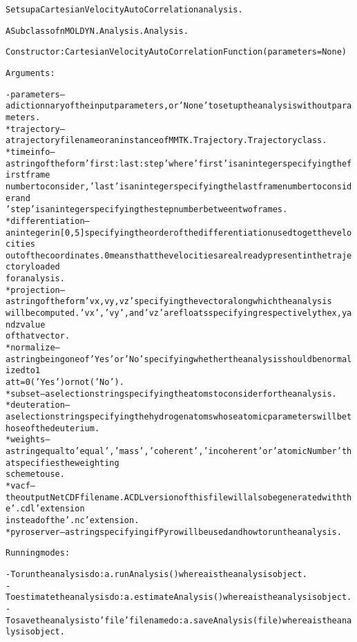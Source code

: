 \begin{alltt}
Sets up a Cartesian Velocity AutoCorrelation analysis.

A Subclass of nMOLDYN.Analysis.Analysis. 

Constructor: CartesianVelocityAutoCorrelationFunction({\textbar}parameters{\textbar} = None)

Arguments:

    - {\textbar}parameters{\textbar} -- a dictionnary of the input parameters, or 'None' to set up the analysis without parameters.
        * trajectory      -- a trajectory file name or an instance of MMTK.Trajectory.Trajectory class.
        * timeinfo        -- a string of the form 'first:last:step' where 'first' is an integer specifying the first frame 
                             number to consider, 'last' is an integer specifying the last frame number to consider and 
                             'step' is an integer specifying the step number between two frames.
        * differentiation -- an integer in [0,5] specifying the order of the differentiation used to get the velocities
                             out of the coordinates. 0 means that the velocities are already present in the trajectory loaded
                             for analysis.
        * projection      -- a string of the form 'vx,vy,vz' specifying the vector along which the analysis
                             will be computed. 'vx', 'vy', and 'vz' are floats specifying respectively the x, y and z value 
                             of that vector.
        * normalize       -- a string being one of 'Yes' or 'No' specifying whether the analysis should be normalized to 1
                             at t = 0 ('Yes') or not ('No').
        * subset          -- a selection string specifying the atoms to consider for the analysis.
        * deuteration     -- a selection string specifying the hydrogen atoms whose atomic parameters will be those of the deuterium.
        * weights         -- a string equal to 'equal', 'mass', 'coherent' , 'incoherent' or 'atomicNumber' that specifies the weighting
                             scheme to use.
        * vacf            -- the output NetCDF file name. A CDL version of this file will also be generated with the '.cdl' extension
                             instead of the '.nc' extension.
        * pyroserver      -- a string specifying if Pyro will be used and how to run the analysis.
    
Running modes:

    - To run the analysis do: a.runAnalysis() where a is the analysis object.
    - To estimate the analysis do: a.estimateAnalysis() where a is the analysis object.
    - To save the analysis to 'file' file name do: a.saveAnalysis(file) where a is the analysis object.
\end{alltt}


